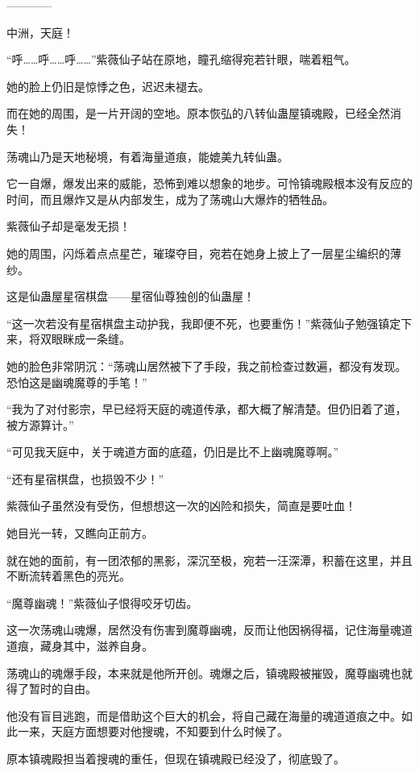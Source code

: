 
\begin{this_body}

------------

中洲，天庭！

“呼……呼……呼……”紫薇仙子站在原地，瞳孔缩得宛若针眼，喘着粗气。

她的脸上仍旧是惊悸之色，迟迟未褪去。

而在她的周围，是一片开阔的空地。原本恢弘的八转仙蛊屋镇魂殿，已经全然消失！

荡魂山乃是天地秘境，有着海量道痕，能媲美九转仙蛊。

它一自爆，爆发出来的威能，恐怖到难以想象的地步。可怜镇魂殿根本没有反应的时间，而且爆炸又是从内部发生，成为了荡魂山大爆炸的牺牲品。

紫薇仙子却是毫发无损！

她的周围，闪烁着点点星芒，璀璨夺目，宛若在她身上披上了一层星尘编织的薄纱。

这是仙蛊屋星宿棋盘——星宿仙尊独创的仙蛊屋！

“这一次若没有星宿棋盘主动护我，我即便不死，也要重伤！”紫薇仙子勉强镇定下来，将双眼眯成一条缝。

她的脸色非常阴沉：“荡魂山居然被下了手段，我之前检查过数遍，都没有发现。恐怕这是幽魂魔尊的手笔！”

“我为了对付影宗，早已经将天庭的魂道传承，都大概了解清楚。但仍旧着了道，被方源算计。”

“可见我天庭中，关于魂道方面的底蕴，仍旧是比不上幽魂魔尊啊。”

“还有星宿棋盘，也损毁不少！”

紫薇仙子虽然没有受伤，但想想这一次的凶险和损失，简直是要吐血！

她目光一转，又瞧向正前方。

就在她的面前，有一团浓郁的黑影，深沉至极，宛若一汪深潭，积蓄在这里，并且不断流转着黑色的亮光。

“魔尊幽魂！”紫薇仙子恨得咬牙切齿。

这一次荡魂山魂爆，居然没有伤害到魔尊幽魂，反而让他因祸得福，记住海量魂道道痕，藏身其中，滋养自身。

荡魂山的魂爆手段，本来就是他所开创。魂爆之后，镇魂殿被摧毁，魔尊幽魂也就得了暂时的自由。

他没有盲目逃跑，而是借助这个巨大的机会，将自己藏在海量的魂道道痕之中。如此一来，天庭方面想要对他搜魂，不知要到什么时候了。

原本镇魂殿担当着搜魂的重任，但现在镇魂殿已经没了，彻底毁了。


\end{this_body}
